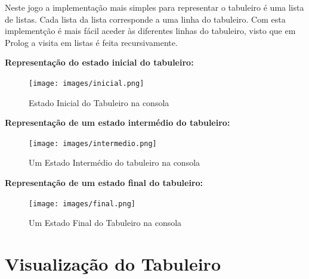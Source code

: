 \documentclass[a4paper]{article}
\begin{document}
Neste jogo a implementação mais simples para representar o tabuleiro é uma lista de listas. Cada lista da lista corresponde a uma linha do tabuleiro. Com esta implementção é mais fácil aceder às diferentes linhas do tabuleiro, visto que em Prolog a visita em listas é feita recursivamente.
\linebreak\

\textbf{Representação do estado inicial do tabuleiro:}


\begin{figure}[H]
	\centering
	\texttt{[image: images/inicial.png]}
	\caption{Estado Inicial do Tabuleiro na consola}
	\label{fig:estado_inicial}
\end{figure}

\textbf{Representação de um estado intermédio do tabuleiro:}
\linebreak


\begin{figure}[H]
	\centering
	\texttt{[image: images/intermedio.png]}
	\caption{Um Estado Intermédio do tabuleiro na consola}
	\label{fig:estado_intermedio}
\end{figure}
\newpage
\textbf{Representação de um estado final do tabuleiro:}
\linebreak


\begin{figure}[H]
	\centering
	\texttt{[image: images/final.png]}
	\caption{Um Estado Final do Tabuleiro na consola}
	\label{fig:estado_final}
\end{figure}

\newpage
\section{Visualização do Tabuleiro}

\end{document}
